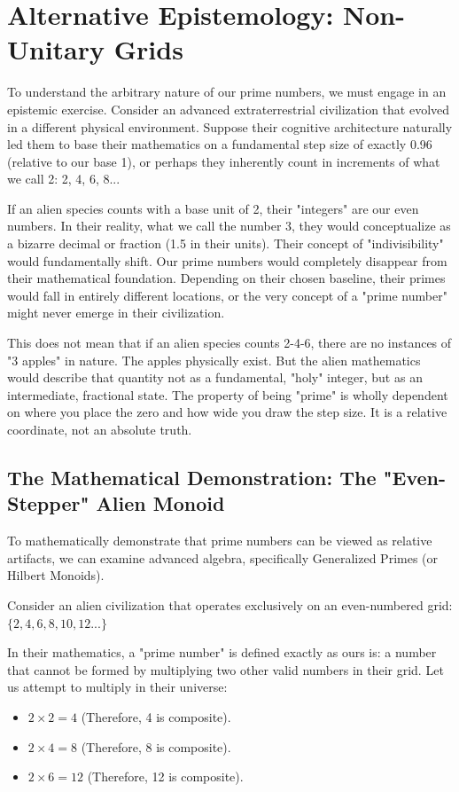 \documentclass[12pt]{article}
\begin{document}
\section{Alternative Epistemology: Non-Unitary Grids}
To understand the arbitrary nature of our prime numbers, we must engage in an epistemic exercise. Consider an advanced extraterrestrial civilization that evolved in a different physical environment. Suppose their cognitive architecture naturally led them to base their mathematics on a fundamental step size of exactly 0.96 (relative to our base 1), or perhaps they inherently count in increments of what we call 2: 2, 4, 6, 8...

If an alien species counts with a base unit of 2, their "integers" are our even numbers. In their reality, what we call the number 3, they would conceptualize as a bizarre decimal or fraction (1.5 in their units). Their concept of "indivisibility" would fundamentally shift. Our prime numbers would completely disappear from their mathematical foundation. Depending on their chosen baseline, their primes would fall in entirely different locations, or the very concept of a "prime number" might never emerge in their civilization.

This does not mean that if an alien species counts 2-4-6, there are no instances of "3 apples" in nature. The apples physically exist. But the alien mathematics would describe that quantity not as a fundamental, "holy" integer, but as an intermediate, fractional state. The property of being "prime" is wholly dependent on where you place the zero and how wide you draw the step size. It is a relative coordinate, not an absolute truth.

\subsection{The Mathematical Demonstration: The "Even-Stepper" Alien Monoid}
To mathematically demonstrate that prime numbers can be viewed as relative artifacts, we can examine advanced algebra, specifically Generalized Primes (or Hilbert Monoids). 

Consider an alien civilization that operates exclusively on an even-numbered grid: $\{2, 4, 6, 8, 10, 12...\}$

In their mathematics, a "prime number" is defined exactly as ours is: a number that cannot be formed by multiplying two other valid numbers in their grid. Let us attempt to multiply in their universe:
\begin{itemize}
    \item $2 \times 2 = 4$ (Therefore, 4 is composite).
    \item $2 \times 4 = 8$ (Therefore, 8 is composite).
    \item $2 \times 6 = 12$ (Therefore, 12 is composite).
\end{itemize}
\end{document}
